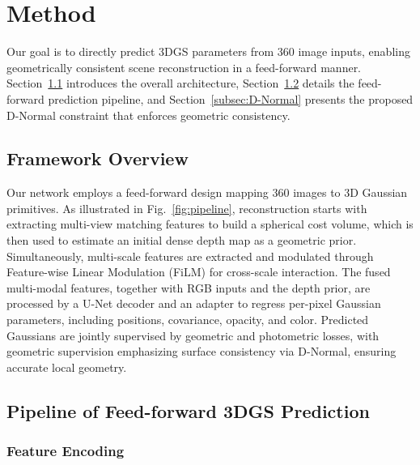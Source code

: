 \section{Method}\label{sec:method}

Our goal is to directly predict 3DGS parameters from 360 image inputs, enabling geometrically consistent scene reconstruction in a feed-forward manner. 
Section~\ref{subsec:framework} introduces the overall architecture, Section~\ref{subsec:pipeline} details the feed-forward prediction pipeline, and Section~\ref{subsec:D-Normal} presents the proposed D-Normal constraint that enforces geometric consistency.

\subsection{Framework Overview}\label{subsec:framework}
Our network employs a feed-forward design mapping 360 images to 3D Gaussian primitives. 
As illustrated in Fig.~\ref{fig:pipeline}, reconstruction starts with extracting multi-view matching features to build a spherical cost volume, which is then used to estimate an initial dense depth map as a geometric prior. 
Simultaneously, multi-scale features are extracted and modulated through Feature-wise Linear Modulation (FiLM) for cross-scale interaction.
The fused multi-modal features, together with RGB inputs and the depth prior, are processed by a U-Net decoder and an adapter to regress per-pixel Gaussian parameters, including positions, covariance, opacity, and color. 
Predicted Gaussians are jointly supervised by geometric and photometric losses, with geometric supervision emphasizing surface consistency via D-Normal, ensuring accurate local geometry.

\subsection{Pipeline of Feed-forward 3DGS Prediction}\label{subsec:pipeline}

\subsubsection{Feature Encoding}\label{sec:feature}

